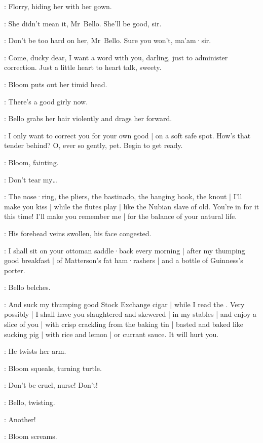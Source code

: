 :
Florry,
hiding her with her gown.

\Florry:
She didn't mean it,
Mr~Bello.
She'll be good,
sir.

\Kitty:
Don't be too hard on her,
Mr~Bello.
%
Sure you won't,
ma'am·sir.

\Bello:
Come,
ducky dear,
I want a word with you,
darling,
just to administer correction.
Just a little heart to heart talk,
sweety.

:
Bloom puts out her timid head.

\Bello:
There's a good girly now.

:
Bello grabs her hair violently and drags her forward.

\Bello:
I only want to correct you for your own good |
on a soft safe spot.
How's that tender behind?
O,
ever so gently,
pet.
Begin to get ready.

:
Bloom,
fainting.

\Bloom:
Don't tear my…

\Bello:
The nose·ring,
the pliers,
the bastinado,
the hanging hook,
the knout |
I'll make you kiss |
while the flutes play |
like the Nubian slave of old.
You're in for it this time!
I'll make you remember me |
for the balance of your natural life.

:
His forehead veins swollen,
his face congested.

\Bello:
I shall sit on your ottoman saddle·back every morning |
after my thumping good breakfast |
of Matterson's fat ham·rashers |
and a bottle of Guinness's porter.

:
Bello belches.

\Bello:
And suck my thumping good Stock Exchange cigar |
while I read the .
Very possibly |
I shall have you slaughtered and skewered |
in my stables |
and enjoy a slice of you |
with crisp crackling from the baking tin |
%
basted and baked like sucking pig |
with rice and lemon |
or currant sauce.
It will hurt you.

:
He twists her arm.

:
Bloom squeals,
turning turtle.

\Bloom:
Don't be cruel,
nurse!
Don't!

:
Bello,
twisting.

\Bello:
Another!

:
Bloom screams.


